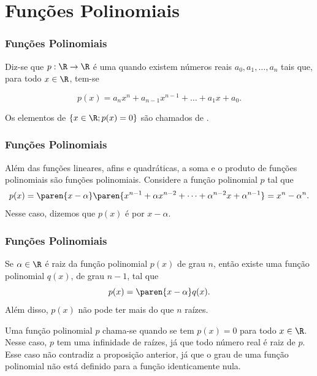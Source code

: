 \section{Funções Polinomiais}
\begin{frame}
    \frametitle{Funções Polinomiais} 
    
    \begin{definicao}
    Diz-se que $p: \R \to \R$ é uma  quando
    existem números reais $a_0, a_1, \dots , a_n$ tais que, para todo $x
    \in \R$, tem-se
    
    \begin{equation}\label{funcpol}
    p(x) = a_n x^n + a_{n-1} x^{n-1} + \dots + a_1 x + a_0.
    \end{equation}
    
    Os elementos de $\{x \in \R ; p(x) = 0\}$ são chamados de .
    \end{definicao}
    
    \end{frame}
    
    
    
    
    \begin{frame}
    \frametitle{Funções Polinomiais} 
    
    \begin{exemplo}
    Além das funções lineares, afins e quadráticas, a soma e o produto
    de funções polinomiais são funções polinomiais. Considere a função
    polinomial $p$ tal que $$p(x) = \paren{x - \alpha} \paren{x^{n-1} +
    \alpha x^{n-2} + \dots + \alpha^{n-2}x+ \alpha^{n-1}}=x^n -
    \alpha^n.$$ Nesse caso, dizemos que $p(x)$ é  por $x-
    \alpha$.
    \end{exemplo}
    
    \end{frame}
    
    
    
    
    \begin{frame}
    \frametitle{Funções Polinomiais} 
    \begin{proposicao}
    Se $\alpha \in \R$ é raiz da função polinomial $p(x)$ de grau $n$,
    então existe uma função polinomial $q(x)$, de grau $n-1$, tal que
    $$p(x) = \paren{x- \alpha}q(x).$$
    Além disso, $p(x)$ não pode ter mais do que $n$ raízes.
    \end{proposicao}\pause
    
    Uma função polinomial $p$ chama-se  quando
    se tem $p(x) = 0$ para todo $x \in \R$. Nesse caso, $p$ tem uma
    infinidade de raízes, já que todo número real é raiz de $p$. Esse
    caso não contradiz a proposição anterior, já que o grau de uma
    função polinomial não está definido para a função identicamente
    nula.
    
    \end{frame}
    
